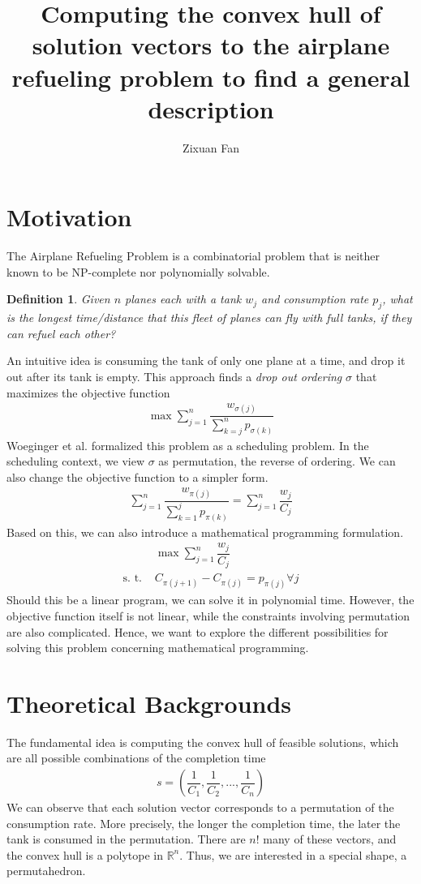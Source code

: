 \documentclass[12pt,letterpaper]{article}
\title{Computing the convex hull of solution vectors to the airplane refueling problem to find a general description}
\author{Zixuan Fan}
\newcommand*{\R}{\mathbb{R}}
\newtheorem{definition}[theorem]{Definition}
\begin{document}
\maketitle

\section{Motivation}
The Airplane Refueling Problem is a combinatorial problem that is 
neither known to be NP-complete nor polynomially solvable. 
\begin{definition}
 Given $n$ planes each with a tank $w_j$ and consumption rate $p_j$,
 what is the longest time/distance that this fleet of planes can fly with full tanks,
 if they can refuel each other?
\end{definition}
An intuitive idea is consuming the tank of only one plane 
at a time, and drop it out after its tank is empty. This approach 
finds a \textit{drop out ordering} $\sigma$
that maximizes the objective function 
\begin{align*}
    \max \sum_{j=1}^{n} \dfrac{w_{\sigma(j)}}{\sum_{k = j}^n p_{\sigma(k)}}
\end{align*}
Woeginger et al. formalized this problem as a scheduling problem. \cite{woeginger2010scheduling}
In the scheduling context, we view $\sigma$ as permutation, the reverse of ordering.
We can also change the objective function to a simpler form. 
\begin{align*}
    \sum_{j = 1}^n \dfrac{w_{\pi(j)}}{\sum_{k = 1}^j p_{\pi(k)}} =  \sum_{j = 1}^n \dfrac{w_{j}}{C_j}
\end{align*}
Based on this, we can also introduce a mathematical programming formulation.
\begin{align}
    &\max \sum_{j = 1}^n \dfrac{w_j}{C_j} \label{eq:mathprog} \tag{A} \\ 
    \text{s. t.\ }& C_{\pi(j+1)} - C_{\pi(j)} = p_{\pi(j)} \forall j \nonumber
\end{align}
Should this be a linear program, we can solve it in polynomial time. However, the objective function 
itself is not linear, while the constraints involving permutation are also complicated. 
Hence, we want to explore the different possibilities for solving this problem concerning mathematical programming. 
\section{Theoretical Backgrounds}
The fundamental idea is computing the convex hull of feasible solutions, which are all possible combinations of the completion time 
\begin{align*}
 s = \left( \dfrac{1}{C_1}, \dfrac{1}{C_2}, ..., \dfrac{1}{C_n}\right)
\end{align*} 
We can observe that each solution vector corresponds to a permutation of the consumption rate. 
More precisely, the longer the completion time, the later the tank is consumed in the permutation.
There are $n!$ many of these vectors, and the convex hull is a polytope in $\R^n$. 
Thus, we are interested in a special shape, a permutahedron.
\end{document}
